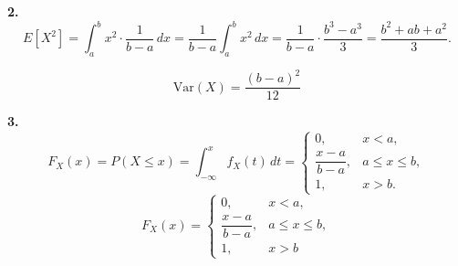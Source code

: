 \documentclass[12pt, a4paper]{article}
\begin{document}
\textbf{2. }
\[
E[X^2] = \int_a^b x^2 \cdot \frac{1}{b-a} \, dx
= \frac{1}{b-a} \int_a^b x^2 \, dx
= \frac{1}{b-a} \cdot \frac{b^3 - a^3}{3}
= \frac{b^2 + ab + a^2}{3}.
\]

\[
\boxed{\mathrm{Var}(X) = \frac{(b-a)^2}{12}}
\]

\textbf{3. }
\[
F_X(x) = P(X \le x) = \int_{-\infty}^x f_X(t) \, dt
=
\begin{cases}
0, & x < a, \\
\dfrac{x-a}{b-a}, & a \le x \le b, \\
1, & x > b.
\end{cases}
\]
\[
\boxed{
F_X(x) =
\begin{cases}
0, & x < a, \\
\dfrac{x-a}{b-a}, & a \le x \le b, \\
1, & x > b
\end{cases}
}
\]


\end{document}
